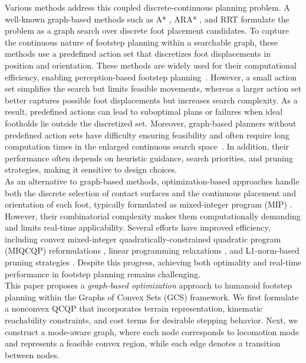 \documentclass[letterpaper, 10 pt, journal, twoside]{IEEEtran}
\begin{document}
Various methods address this coupled discrete-continuous planning problem.
A well-known graph-based methods such as A* \cite{chestnutt2003planning, chestnutt2005footstep, chestnutt2007adaptive}, ARA* \cite{hornung2012anytime}, and RRT \cite{xia2010global, liu2012hierarchical} formulate the problem as a graph search over discrete foot placement candidates. 
To capture the continuous nature of footstep planning within a searchable graph, these methods use a predefined action set that discretizes foot displacements in position and orientation.
These methods are widely used for their computational efficiency, enabling perception-based footstep planning~\cite{griffin2019footstep, michel2005vision}.
However, a small action set simplifies the search but limits feasible movements, whereas a larger action set better captures possible foot displacements but increases search complexity.
As a result, predefined actions can lead to suboptimal plans or failures when ideal footholds lie outside the discretized set.
Moreover, graph-based planners without predefined action sets have difficulty ensuring feasibility and often require long computation times in the enlarged continuous search space~\cite{marussi2025humanoid}.
In addition, their performance often depends on heuristic guidance, search priorities, and pruning strategies, making it sensitive to design choices.
\\
\indent
As an alternative to graph-based methods, optimization-based approaches handle both the discrete selection of contact surfaces and the continuous placement and orientation of each foot, typically formulated as mixed-integer program (MIP) \cite{dai2019global,driess2020deep,ponton2021efficient}.
However, their combinatorial complexity makes them computationally demanding and limits real-time applicability.
Several efforts have improved efficiency, including convex mixed-integer quadratically-constrained quadratic
program (MIQCQP) reformulations \cite{deits2014footstep}, linear programming relaxations \cite{tonneau2020sl1m}, and L1-norm-based pruning strategies \cite{song2021solving}.
Despite this progress, achieving both optimality and real-time performance in footstep planning remains challenging.
\\
\indent
This paper proposes a \textit{graph-based optimization} approach to humanoid footstep planning within the  Graphs of Convex Sets (GCS) framework.
We first formulate a nonconvex QCQP that incorporates terrain representation, kinematic reachability constraints, and cost terms for desirable stepping behavior.
Next, we construct a mode-aware graph, where each node corresponds to locomotion mode and represents a feasible convex region, while each edge denotes a transition between nodes.
\end{document}
